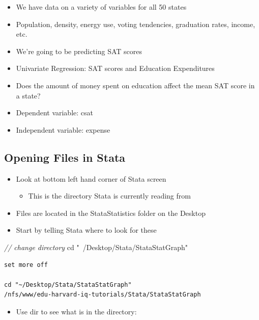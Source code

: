 \documentclass[]{book}
\newenvironment{Shaded}{\begin{snugshade}}{\end{snugshade}}
\newcommand{\CommentTok}[1]{\textcolor[rgb]{0.56,0.35,0.01}{\textit{#1}}}
\newcommand{\NormalTok}[1]{#1}
\newcommand{\StringTok}[1]{\textcolor[rgb]{0.31,0.60,0.02}{#1}}
\providecommand{\tightlist}{%
  \setlength{\itemsep}{0pt}\setlength{\parskip}{0pt}}
\begin{document}
\begin{itemize}
\tightlist
\item
  We have data on a variety of variables for all 50 states
\item
  Population, density, energy use, voting tendencies, graduation rates, income, etc.
\item
  We're going to be predicting SAT scores
\item
  Univariate Regression: SAT scores and Education Expenditures
\item
  Does the amount of money spent on education affect the mean SAT score in a state?
\item
  Dependent variable: csat
\item
  Independent variable: expense
\end{itemize}

\hypertarget{opening-files-in-stata-1}{%
\subsection{Opening Files in Stata}\label{opening-files-in-stata-1}}

\begin{itemize}
\tightlist
\item
  Look at bottom left hand corner of Stata screen

  \begin{itemize}
  \tightlist
  \item
    This is the directory Stata is currently reading from
  \end{itemize}
\item
  Files are located in the StataStatistics folder on the Desktop
\item
  Start by telling Stata where to look for these
\end{itemize}

\begin{Shaded}
\begin{Highlighting}[]
  \CommentTok{// change directory}
\NormalTok{  cd }\StringTok{"~/Desktop/Stata/StataStatGraph"}
\end{Highlighting}
\end{Shaded}

\begin{verbatim}
set more off

cd "~/Desktop/Stata/StataStatGraph"
/nfs/www/edu-harvard-iq-tutorials/Stata/StataStatGraph
\end{verbatim}

\begin{itemize}
\tightlist
\item
  Use dir to see what is in the directory:
\end{itemize}
\end{document}
